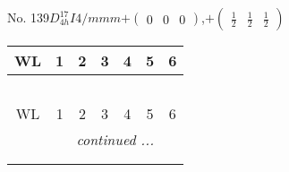 \documentclass[fleqn,9pt,landscape]{jsarticle}
\begin{document}
\newpage
No. 139\quad$D_{4h}^{17}$\quad$I4/mmm$\quad[ tetragonal ]\quad$+\begin{pmatrix} 0 & 0 & 0 \end{pmatrix}$,\quad $+\begin{pmatrix} \frac{1}{2} & \frac{1}{2} & \frac{1}{2} \end{pmatrix}$
\begin{center}
\renewcommand{\arraystretch}{1.2}
\begin{longtable}{ccccccc}
 \hline \hline
WL & 1 & 2 & 3 & 4 & 5 & 6 \\ \hline \endfirsthead

\multicolumn{6}{l}{\tablename\ \thetable{}} \\
 \hline \hline
WL & 1 & 2 & 3 & 4 & 5 & 6 \\ \hline \endhead

 \hline \hline
\multicolumn{6}{r}{\footnotesize\it continued ...} \\ \endfoot

 \hline \hline
\multicolumn{6}{r}{} \\ \endlastfoot


\end{longtable}
\end{center}
\end{document}
